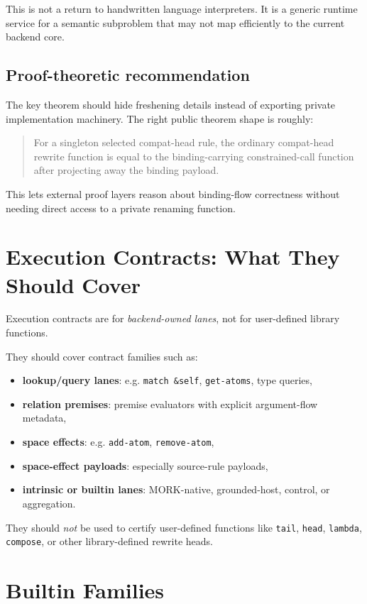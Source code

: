 \documentclass[11pt]{article}
\begin{document}
This is not a return to handwritten language interpreters. It is a generic runtime service for a semantic subproblem that may not map efficiently to the current backend core.

\subsection{Proof-theoretic recommendation}
The key theorem should hide freshening details instead of exporting private implementation machinery. The right public theorem shape is roughly:
\begin{quote}
For a singleton selected compat-head rule, the ordinary compat-head rewrite function is equal to the binding-carrying constrained-call function after projecting away the binding payload.
\end{quote}

This lets external proof layers reason about binding-flow correctness without needing direct access to a private renaming function.

\section{Execution Contracts: What They Should Cover}

Execution contracts are for \emph{backend-owned lanes}, not for user-defined library functions.

They should cover contract families such as:
\begin{itemize}
  \item \textbf{lookup/query lanes}: e.g. \texttt{match \&self}, \texttt{get-atoms}, type queries,
  \item \textbf{relation premises}: premise evaluators with explicit argument-flow metadata,
  \item \textbf{space effects}: e.g. \texttt{add-atom}, \texttt{remove-atom},
  \item \textbf{space-effect payloads}: especially source-rule payloads,
  \item \textbf{intrinsic or builtin lanes}: MORK-native, grounded-host, control, or aggregation.
\end{itemize}

They should \emph{not} be used to certify user-defined functions like \texttt{tail}, \texttt{head}, \texttt{lambda}, \texttt{compose}, or other library-defined rewrite heads.

\section{Builtin Families}
\end{document}
